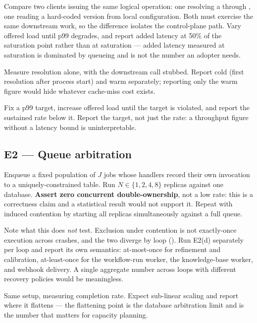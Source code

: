  Compare two clients issuing the same logical
operation: one resolving a \gasset through \sys, one reading a hard-coded version
from local configuration. Both must exercise the same downstream work, so the
difference isolates the control-plane path. Vary offered load until p99 degrades,
and report added latency at 50\% of the saturation point rather than at saturation ---
added latency measured at saturation is dominated by queueing and is not the number
an adopter needs.

 Measure resolution alone, with the downstream call
stubbed. Report cold (first resolution after process start) and warm separately;
reporting only the warm figure would hide whatever cache-miss cost exists.

 Fix a p99 target, increase offered load until
the target is violated, and report the sustained rate below it. Report the target,
not just the rate: a throughput figure without a latency bound is uninterpretable.

\subsection{E2 --- Queue arbitration}

 Enqueue a fixed
population of $J$ jobs whose handlers record their own invocation to a
uniquely-constrained table. Run $N \in \{1,2,4,8\}$ replicas against one database.
\textbf{Assert zero concurrent double-ownership}, not a low rate: this is a
correctness claim and a statistical result would not support it. Repeat with
induced contention by starting all replicas simultaneously against a full queue.

Note what this does \emph{not} test. Exclusion under contention is not
exactly-once execution across crashes, and the two diverge by loop
(). Run E2(d) separately per loop and report its own semantics:
at-most-once for refinement and calibration, at-least-once for the workflow-run
worker, the knowledge-base worker, and webhook delivery. A single aggregate number
across loops with different recovery policies would be meaningless.

 Same setup, measuring completion
rate. Expect sub-linear scaling and report where it flattens --- the flattening point
is the database arbitration limit and is the number that matters for capacity
planning.

